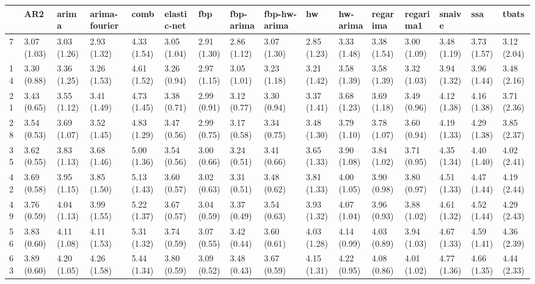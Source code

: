 \begin{tabular}{llllllllllllllll}
\toprule
{} &          AR2 &        arima & arima-fourier &         comb &  elastic-net &          fbp &    fbp-arima & fbp-hw-arima &           hw &     hw-arima &     regarima &    regarima1 &       snaive &          ssa &        tbats \\
\midrule
7   &  3.07 (1.03) &  3.03 (1.26) &   2.93 (1.32) &  4.33 (1.54) &  3.05 (1.04) &  2.91 (1.30) &  2.86 (1.12) &  3.07 (1.30) &  2.85 (1.23) &  3.33 (1.48) &  3.38 (1.54) &  3.00 (1.09) &  3.48 (1.19) &  3.73 (1.57) &  3.12 (2.04) \\
14  &  3.30 (0.88) &  3.36 (1.25) &   3.26 (1.53) &  4.61 (1.52) &  3.26 (0.94) &  2.97 (1.15) &  3.05 (1.01) &  3.23 (1.18) &  3.21 (1.42) &  3.58 (1.39) &  3.58 (1.39) &  3.32 (1.03) &  3.94 (1.32) &  3.96 (1.44) &  3.48 (2.16) \\
21  &  3.43 (0.65) &  3.55 (1.12) &   3.41 (1.49) &  4.73 (1.45) &  3.38 (0.71) &  2.99 (0.91) &  3.12 (0.77) &  3.30 (0.94) &  3.37 (1.41) &  3.68 (1.23) &  3.69 (1.18) &  3.49 (0.96) &  4.12 (1.38) &  4.16 (1.38) &  3.71 (2.36) \\
28  &  3.54 (0.53) &  3.69 (1.07) &   3.52 (1.45) &  4.83 (1.29) &  3.47 (0.56) &  2.99 (0.75) &  3.17 (0.58) &  3.34 (0.75) &  3.48 (1.30) &  3.79 (1.10) &  3.78 (1.07) &  3.60 (0.94) &  4.19 (1.33) &  4.29 (1.38) &  3.85 (2.37) \\
35  &  3.62 (0.55) &  3.83 (1.13) &   3.68 (1.46) &  5.00 (1.36) &  3.54 (0.56) &  3.00 (0.66) &  3.24 (0.51) &  3.41 (0.66) &  3.65 (1.33) &  3.90 (1.08) &  3.84 (1.02) &  3.71 (0.95) &  4.35 (1.34) &  4.40 (1.40) &  4.02 (2.41) \\
42  &  3.69 (0.58) &  3.95 (1.15) &   3.85 (1.50) &  5.13 (1.43) &  3.60 (0.57) &  3.02 (0.63) &  3.31 (0.51) &  3.48 (0.62) &  3.81 (1.33) &  4.00 (1.05) &  3.90 (0.98) &  3.80 (0.97) &  4.51 (1.33) &  4.47 (1.44) &  4.19 (2.44) \\
49  &  3.76 (0.59) &  4.04 (1.13) &   3.99 (1.55) &  5.22 (1.37) &  3.67 (0.57) &  3.04 (0.59) &  3.37 (0.49) &  3.54 (0.63) &  3.93 (1.32) &  4.07 (1.04) &  3.96 (0.93) &  3.88 (1.02) &  4.61 (1.32) &  4.52 (1.44) &  4.29 (2.43) \\
56  &  3.83 (0.60) &  4.11 (1.08) &   4.11 (1.53) &  5.31 (1.32) &  3.74 (0.59) &  3.07 (0.55) &  3.42 (0.44) &  3.60 (0.61) &  4.03 (1.28) &  4.14 (0.99) &  4.03 (0.89) &  3.94 (1.03) &  4.67 (1.33) &  4.59 (1.41) &  4.36 (2.39) \\
63  &  3.89 (0.60) &  4.20 (1.05) &   4.26 (1.58) &  5.44 (1.34) &  3.80 (0.59) &  3.09 (0.52) &  3.48 (0.43) &  3.67 (0.59) &  4.15 (1.31) &  4.22 (0.95) &  4.08 (0.86) &  4.01 (1.02) &  4.77 (1.36) &  4.66 (1.35) &  4.44 (2.33) \\

\end{tabular}
